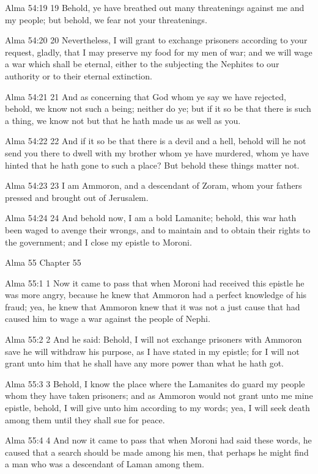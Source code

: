 Alma 54:19
 19 Behold, ye have breathed out many threatenings against me and
my people; but behold, we fear not your threatenings.

Alma 54:20
 20 Nevertheless, I will grant to exchange prisoners according to
your request, gladly, that I may preserve my food for my men of
war; and we will wage a war which shall be eternal, either to the
subjecting the Nephites to our authority or to their eternal
extinction.

Alma 54:21
 21 And as concerning that God whom ye say we have rejected,
behold, we know not such a being; neither do ye; but if it so be
that there is such a thing, we know not but that he hath made us
as well as you.

Alma 54:22
 22 And if it so be that there is a devil and a hell, behold will
he not send you there to dwell with my brother whom ye have
murdered, whom ye have hinted that he hath gone to such a place?
But behold these things matter not.

Alma 54:23
 23 I am Ammoron, and a descendant of Zoram, whom your fathers
pressed and brought out of Jerusalem.

Alma 54:24
 24 And behold now, I am a bold Lamanite; behold, this war hath
been waged to avenge their wrongs, and to maintain and to obtain
their rights to the government; and I close my epistle to Moroni.

Alma 55
Chapter 55

Alma 55:1
 1 Now it came to pass that when Moroni had received this epistle
he was more angry, because he knew that Ammoron had a perfect
knowledge of his fraud; yea, he knew that Ammoron knew that it
was not a just cause that had caused him to wage a war against
the people of Nephi.

Alma 55:2
 2 And he said: Behold, I will not exchange prisoners with
Ammoron save he will withdraw his purpose, as I have stated in my
epistle; for I will not grant unto him that he shall have any
more power than what he hath got.

Alma 55:3
 3 Behold, I know the place where the Lamanites do guard my
people whom they have taken prisoners; and as Ammoron would not
grant unto me mine epistle, behold, I will give unto him
according to my words; yea, I will seek death among them until
they shall sue for peace.

Alma 55:4
 4 And now it came to pass that when Moroni had said these words,
he caused that a search should be made among his men, that
perhaps he might find a man who was a descendant of Laman among
them.

